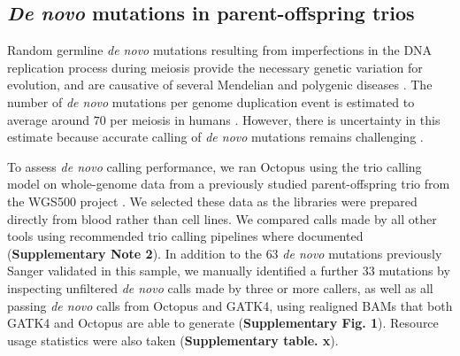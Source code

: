 \documentclass[notitlepage, twocolumn, 10pt]{article}
\begin{document}
\subsection*{\textit{De novo} mutations in parent-offspring trios}

Random germline \textit{de novo} mutations resulting from imperfections in the DNA replication process during meiosis provide the necessary genetic variation for evolution, and are causative of several Mendelian and polygenic diseases \cite{RN157, RN160, RN159}. The number of \textit{de novo} mutations per genome duplication event is estimated to average around $70$ per meiosis in humans \cite{RN6}. However, there is uncertainty in this estimate because accurate calling of \textit{de novo} mutations remains challenging \cite{RN3, RN514, RN541, RN6, RN572}.

\begin{table}[bp]
    \centering
    \caption{\textit{De novo} mutations called in a WGS500 trio.}
    \label{table:denovo}
    \small
    \sffamily
\end{table}

To assess \textit{de novo} calling performance, we ran Octopus using the trio calling model on whole-genome data from a previously studied parent-offspring trio from the WGS500 project \cite{RN5}. We selected these data as the libraries were prepared directly from blood rather than cell lines. We compared calls made by all other tools using recommended trio calling pipelines where documented (\textbf{Supplementary Note 2}). In addition to the $63$ \textit{de novo} mutations previously Sanger validated in this sample, we manually identified a further $33$ mutations by inspecting unfiltered \textit{de novo} calls made by three or more callers, as well as all passing \textit{de novo} calls from Octopus and GATK4, using realigned BAMs that both GATK4 and Octopus are able to generate (\textbf{Supplementary Fig. 1}). Resource usage statistics were also taken (\textbf{Supplementary table. x}).
\end{document}
